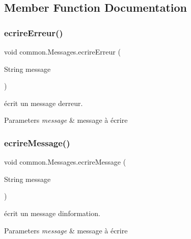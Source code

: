 \subsection{Member Function Documentation}
\mbox{\label{classcommon_1_1Messages_a5d8d6f3ce6024d78171f9e49de7f6136}} 
\subsubsection{\texorpdfstring{ecrire\+Erreur()}{ecrireErreur()}}
{\footnotesize\ttfamily void common.\+Messages.\+ecrire\+Erreur (\begin{DoxyParamCaption}\item[{String}]{message }\end{DoxyParamCaption})\hspace{0.3cm}{\ttfamily [inline]}}



écrit un message d\textquotesingle{}erreur. 


\begin{DoxyParams}{Parameters}
{\em message} & message à écrire \\
\hline
\end{DoxyParams}
\mbox{\label{classcommon_1_1Messages_a6069bc66b0eda8fdd5966a7c7a8a1a0a}} 
\subsubsection{\texorpdfstring{ecrire\+Message()}{ecrireMessage()}}
{\footnotesize\ttfamily void common.\+Messages.\+ecrire\+Message (\begin{DoxyParamCaption}\item[{String}]{message }\end{DoxyParamCaption})\hspace{0.3cm}{\ttfamily [inline]}}



écrit un message d\textquotesingle{}information. 


\begin{DoxyParams}{Parameters}
{\em message} & message à écrire \\
\hline
\end{DoxyParams}
\mbox{\label{classcommon_1_1Messages_a96928a28b3f958fc717fca2c076f773c}} 
